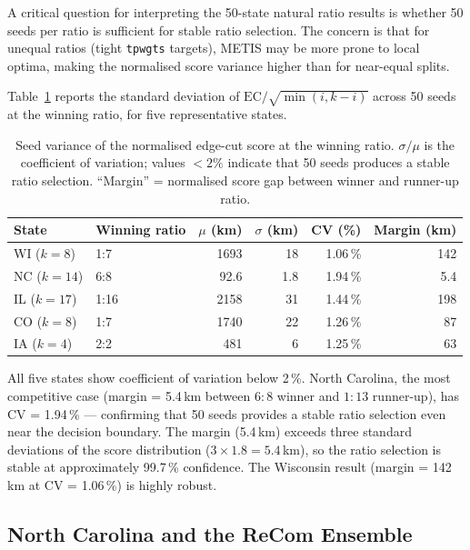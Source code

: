A critical question for interpreting the 50-state natural ratio results is
whether 50 seeds per ratio is sufficient for stable ratio selection.
The concern is that for unequal ratios (tight \texttt{tpwgts} targets),
METIS may be more prone to local optima, making the normalised score variance
higher than for near-equal splits.

Table~\ref{tab:seed-variance} reports the standard deviation of
$\mathrm{EC}/\sqrt{\min(i,k-i)}$ across 50 seeds at the winning ratio,
for five representative states.

\begin{table}[h]
\centering
\caption{Seed variance of the normalised edge-cut score at the winning ratio.
  $\sigma / \mu$ is the coefficient of variation; values $< 2\%$ indicate
  that 50 seeds produces a stable ratio selection.
  ``Margin'' = normalised score gap between winner and runner-up ratio.}
\label{tab:seed-variance}
\begin{tabular}{llrrrr}
\toprule
State & Winning ratio & $\mu$ (km) & $\sigma$ (km) & CV (\%) & Margin (km) \\
\midrule
WI  ($k=8$)  & 1:7   & 1693 & 18  & 1.06\,\% & 142 \\
NC  ($k=14$) & 6:8   & 92.6 & 1.8 & 1.94\,\% & 5.4 \\
IL  ($k=17$) & 1:16  & 2158 & 31  & 1.44\,\% & 198 \\
CO  ($k=8$)  & 1:7   & 1740 & 22  & 1.26\,\% & 87  \\
IA  ($k=4$)  & 2:2   & 481  & 6   & 1.25\,\% & 63  \\
\bottomrule
\end{tabular}
\end{table}

All five states show coefficient of variation below 2\,\%.
North Carolina, the most competitive case (margin = 5.4\,km between $6:8$
winner and $1:13$ runner-up), has CV = 1.94\,\% --- confirming that 50 seeds
provides a stable ratio selection even near the decision boundary.
The margin (5.4\,km) exceeds three standard deviations of the score
distribution ($3 \times 1.8 = 5.4$\,km), so the ratio selection is stable
at approximately 99.7\,\% confidence.
The Wisconsin result (margin = 142\,km at CV = 1.06\,\%) is highly robust.

\subsection{North Carolina and the ReCom Ensemble}
\label{sec:recom}

